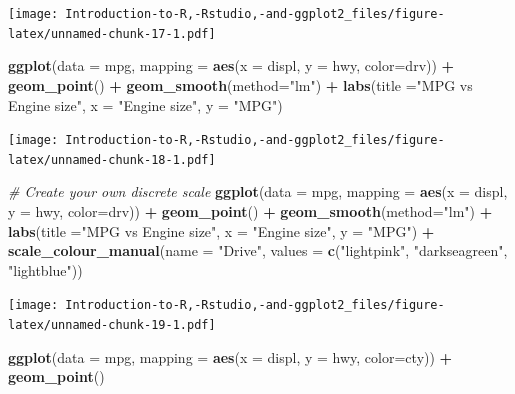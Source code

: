 \documentclass[]{book}
\newenvironment{Shaded}{\begin{snugshade}}{\end{snugshade}}
\newcommand{\CommentTok}[1]{\textcolor[rgb]{0.56,0.35,0.01}{\textit{#1}}}
\newcommand{\DataTypeTok}[1]{\textcolor[rgb]{0.13,0.29,0.53}{#1}}
\newcommand{\KeywordTok}[1]{\textcolor[rgb]{0.13,0.29,0.53}{\textbf{#1}}}
\newcommand{\NormalTok}[1]{#1}
\newcommand{\OperatorTok}[1]{\textcolor[rgb]{0.81,0.36,0.00}{\textbf{#1}}}
\newcommand{\StringTok}[1]{\textcolor[rgb]{0.31,0.60,0.02}{#1}}
\begin{document}
\texttt{[image: Introduction-to-R,-Rstudio,-and-ggplot2\_files/figure-latex/unnamed-chunk-17-1.pdf]}

\begin{Shaded}
\begin{Highlighting}[]
\KeywordTok{ggplot}\NormalTok{(}\DataTypeTok{data =}\NormalTok{ mpg, }\DataTypeTok{mapping =} \KeywordTok{aes}\NormalTok{(}\DataTypeTok{x =}\NormalTok{ displ, }\DataTypeTok{y =}\NormalTok{ hwy, }\DataTypeTok{color=}\NormalTok{drv)) }\OperatorTok{+}\StringTok{ }\KeywordTok{geom_point}\NormalTok{() }\OperatorTok{+}\StringTok{ }\KeywordTok{geom_smooth}\NormalTok{(}\DataTypeTok{method=}\StringTok{"lm"}\NormalTok{) }\OperatorTok{+}\StringTok{ }\KeywordTok{labs}\NormalTok{(}\DataTypeTok{title =}\StringTok{"MPG vs Engine size"}\NormalTok{, }\DataTypeTok{x =} \StringTok{"Engine size"}\NormalTok{, }\DataTypeTok{y =} \StringTok{"MPG"}\NormalTok{)}
\end{Highlighting}
\end{Shaded}

\texttt{[image: Introduction-to-R,-Rstudio,-and-ggplot2\_files/figure-latex/unnamed-chunk-18-1.pdf]}

\begin{Shaded}
\begin{Highlighting}[]
\CommentTok{# Create your own discrete scale}
\KeywordTok{ggplot}\NormalTok{(}\DataTypeTok{data =}\NormalTok{ mpg, }\DataTypeTok{mapping =} \KeywordTok{aes}\NormalTok{(}\DataTypeTok{x =}\NormalTok{ displ, }\DataTypeTok{y =}\NormalTok{ hwy, }\DataTypeTok{color=}\NormalTok{drv)) }\OperatorTok{+}\StringTok{ }\KeywordTok{geom_point}\NormalTok{() }\OperatorTok{+}\StringTok{ }\KeywordTok{geom_smooth}\NormalTok{(}\DataTypeTok{method=}\StringTok{"lm"}\NormalTok{) }\OperatorTok{+}\StringTok{ }\KeywordTok{labs}\NormalTok{(}\DataTypeTok{title =}\StringTok{"MPG vs Engine size"}\NormalTok{, }\DataTypeTok{x =} \StringTok{"Engine size"}\NormalTok{, }\DataTypeTok{y =} \StringTok{"MPG"}\NormalTok{) }\OperatorTok{+}\StringTok{ }\KeywordTok{scale_colour_manual}\NormalTok{(}\DataTypeTok{name =} \StringTok{"Drive"}\NormalTok{, }\DataTypeTok{values =} \KeywordTok{c}\NormalTok{(}\StringTok{"lightpink"}\NormalTok{, }\StringTok{"darkseagreen"}\NormalTok{, }\StringTok{"lightblue"}\NormalTok{))}
\end{Highlighting}
\end{Shaded}

\texttt{[image: Introduction-to-R,-Rstudio,-and-ggplot2\_files/figure-latex/unnamed-chunk-19-1.pdf]}

\begin{Shaded}
\begin{Highlighting}[]
\KeywordTok{ggplot}\NormalTok{(}\DataTypeTok{data =}\NormalTok{ mpg, }\DataTypeTok{mapping =} \KeywordTok{aes}\NormalTok{(}\DataTypeTok{x =}\NormalTok{ displ, }\DataTypeTok{y =}\NormalTok{ hwy, }\DataTypeTok{color=}\NormalTok{cty)) }\OperatorTok{+}\StringTok{ }\KeywordTok{geom_point}\NormalTok{() }
\end{Highlighting}
\end{Shaded}
\end{document}
